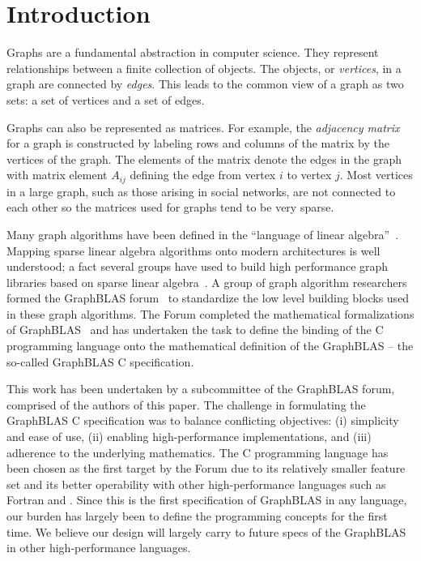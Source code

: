 \section{Introduction}
\label{sec:intro}

Graphs are a fundamental abstraction in computer science.  They represent
relationships between a finite collection of objects.   The objects, or
\emph{vertices}, in a graph are connected by \emph{edges}.  This leads
to the common view of a graph as two sets: a set of vertices and a set
of edges.

Graphs can also be represented as matrices.   For example, the
\emph{adjacency matrix} for a graph is constructed by labeling rows and
columns of the matrix by the vertices of the graph.  The elements of
the matrix denote the edges in the graph with matrix element $A_{ij}$
defining the edge from vertex $i$ to vertex $j$.  Most
vertices in a large graph, such as those arising in social networks,
are not connected to each other so the matrices used for graphs tend to
be very sparse.

Many graph algorithms have been defined in the ``language of linear
algebra''~\cite{kepner2011graph}.  Mapping sparse linear algebra algorithms 
onto modern architectures is well understood; a fact several 
groups have used to build high
performance graph libraries based on sparse linear algebra~\cite{combblas,
gadepally2015graphulo, gpi2016, sundaram2015graphmat,che2016programming}.  A group
of graph algorithm researchers formed the GraphBLAS
forum~\cite{graphblas_web} to standardize the low level building
blocks used in these graph algorithms.  The Forum completed the
mathematical formalizations of GraphBLAS~\cite{mathgraphblas16} and
has undertaken the task to define the
binding of the C programming language onto the mathematical definition of
the GraphBLAS -- the so-called GraphBLAS C specification.  
 

This work has been undertaken by a subcommittee of the GraphBLAS forum, comprised of
the authors of this paper.  The challenge in formulating
the GraphBLAS C specification was to balance conflicting 
objectives: (i) simplicity and ease of use,
(ii) enabling high-performance implementations, and (iii) adherence to
the underlying mathematics. 
The C programming language has been chosen as the first target by the Forum due
to its relatively smaller feature set and its better operability with other high-performance 
languages such as Fortran and \Cpp.
Since this is the first specification of GraphBLAS in any language, our burden 
has largely been to define the programming concepts for the first time. We believe
our design will largely carry to future specs of the GraphBLAS in other high-performance
languages. 


